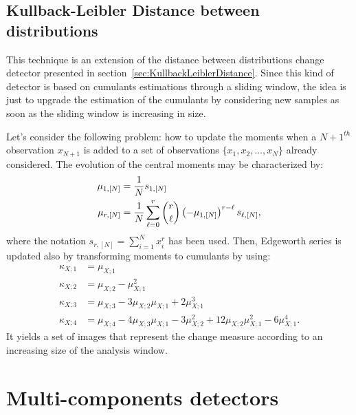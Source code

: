 \subsection{Kullback-Leibler Distance between distributions}
\label{sec:KullbackLeiblerProfile}

This technique is an extension of the distance between distributions 
change detector presented in section~\ref{sec:KullbackLeiblerDistance}.
Since this kind of detector is based on cumulants estimations through
a sliding window, the idea is just to upgrade the estimation of the cumulants
by considering new samples as soon as the sliding window is increasing in size.

Let's consider the following problem: how to update the moments when a
$N+1^{th}$ observation $x_{N+1}$ is added to a set of observations $\{x_1, x_2, \ldots,
x_N\}$ already considered.
The evolution of the central moments may be characterized by:
\begin{align}\label{eqMomentN}
	\mu_{1,[N]} & = \frac{1}{N} s_{1,[N]} \\
	\mu_{r,[N]} & = \frac{1}{N} \sum_{\ell = 0}^r \binom{r}{\ell} 
									\left( -\mu_{1,[N]} \right)^{r-\ell}
									s_{\ell,[N]}, \notag
\end{align}
where the
notation $s_{r,[N]} = \sum_{i=1}^N x_i^r$ has been used.
Then, Edgeworth series is updated also by transforming moments to
cumulants by using:
\begin{equation}\label{eqCumsMoms}
  \begin{split}
\kappa_{X;1} &= \mu_{X;1}\\
\kappa_{X;2} &= \mu_{X;2}-\mu_{X;1}^2\\
\kappa_{X;3} &= \mu_{X;3} - 3\mu_{X;2} \mu_{X;1} + 2\mu_{X;1}^3\\
\kappa_{X;4} &= \mu_{X;4} - 4\mu_{X;3} \mu_{X;1} - 3\mu_{X;2}^2 + 12 \mu_{X;2} \mu_{X;1}^2 - 6\mu_{X;1}^4.
  \end{split}
\end{equation}
It yields a set of images that represent the change measure according to an
increasing size of the analysis window.



\section{Multi-components detectors}





